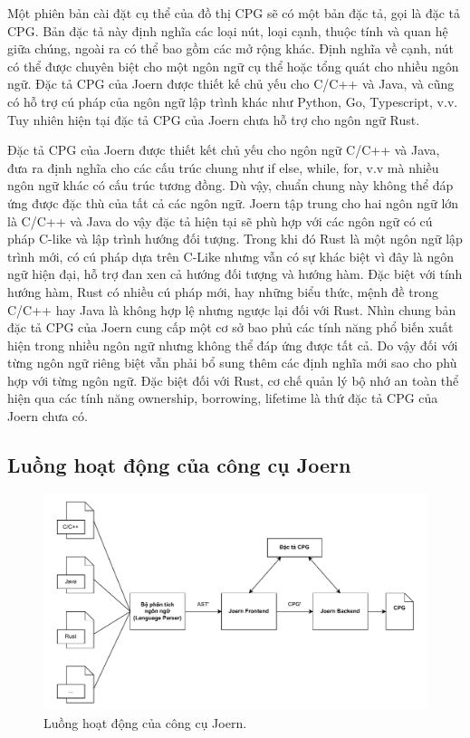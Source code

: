 Một phiên bản cài đặt cụ thể của đồ thị CPG sẽ có một bản đặc tả, gọi là đặc tả CPG.
Bản đặc tả này định nghĩa các loại nút, loại cạnh, thuộc tính và quan hệ giữa chúng, ngoài ra có thể bao gồm các mở rộng khác.
Định nghĩa về cạnh, nút có thể được chuyên biệt cho một ngôn ngữ cụ thể hoặc tổng quát cho nhiều ngôn ngữ.
Đặc tả CPG của Joern được thiết kế chủ yếu cho C/C++ và Java, và cũng có hỗ trợ cú pháp của ngôn ngữ lập trình khác như Python, Go, Typescript, v.v.
Tuy nhiên hiện tại đặc tả CPG của Joern chưa hỗ trợ cho ngôn ngữ Rust.

Đặc tả CPG của Joern được thiết kết chủ yếu cho ngôn ngữ C/C++ và Java, đưa ra định nghĩa cho các cấu trúc chung như if else, while, for, v.v mà nhiều ngôn ngữ khác có cấu trúc tương đồng.
Dù vậy, chuẩn chung này không thể đáp ứng được đặc thù của tất cả các ngôn ngữ.
Joern tập trung cho hai ngôn ngữ lớn là C/C++ và Java do vậy đặc tả hiện tại sẽ phù hợp với các ngôn ngữ có cú pháp C-like và lập trình hướng đối tượng.
Trong khi đó Rust là một ngôn ngữ lập trình mới, có cú pháp dựa trên C-Like nhưng vẫn có sự khác biệt vì đây là ngôn ngữ hiện đại, hỗ trợ đan xen cả hướng đối tượng và hướng hàm.
Đặc biệt với tính hướng hàm, Rust có nhiều cú pháp mới, hay những biểu thức, mệnh đề trong C/C++ hay Java là không hợp lệ nhưng ngược lại đối với Rust.
Nhìn chung bản đặc tả CPG của Joern cung cấp một cơ sở bao phủ các tính năng phổ biến xuất hiện trong nhiều ngôn ngữ nhưng không thể đáp ứng được tất cả.
Do vậy đối với từng ngôn ngữ riêng biệt vẫn phải bổ sung thêm các định nghĩa mới sao cho phù hợp với từng ngôn ngữ.
Đặc biệt đối với Rust, cơ chế quản lý bộ nhớ an toàn thể hiện qua các tính năng ownership, borrowing, lifetime là thứ đặc tả CPG của Joern chưa có.

\subsection{Luồng hoạt động của công cụ Joern}
\label{sec:joern_flow}

\begin{figure}[H]
  \includegraphics[width=1\columnwidth]{figures/c2/c2_frontend_backend.drawio.pdf}
  \centering
  \caption{Luồng hoạt động của công cụ Joern.}
  \label{img:c2_frontend_backend}
\end{figure}

